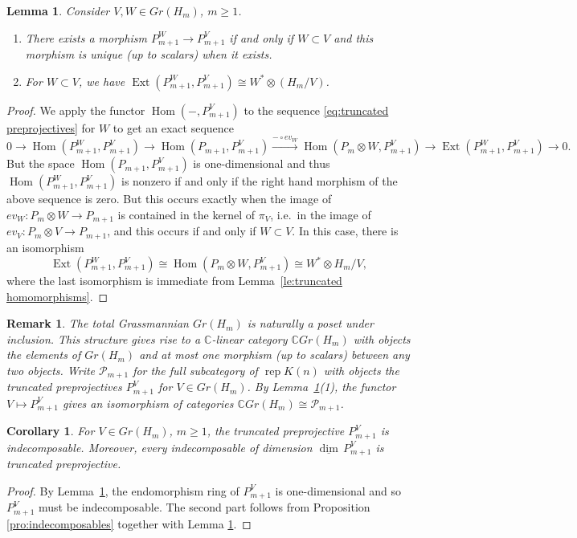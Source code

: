 \documentclass{amsart}
\newtheorem{corollary}[theorem]{Corollary}
\newtheorem{lemma}[theorem]{Lemma}
\newtheorem{remark}[theorem]{Remark}
\newcommand{\cP}{\mathcal{P}}
\newcommand\udim{{\underline{\dim}\, }}
\newcommand{\rep}{\operatorname{rep}}
\newcommand{\CC}{\mathbb{C}}
\newcommand{\Ext}{\operatorname{Ext}}
\newcommand{\Hom}{\operatorname{Hom}}
\begin{document}
\begin{lemma}
  \label{le:unique morphisms}
  Consider $V,W\in Gr(H_m)$, $m\ge1$.
  \begin{enumerate}
    \item There exists a morphism $P_{m+1}^W\to P_{m+1}^V$ if and only if $W\subset V$ and this morphism is unique (up to scalars) when it exists.
    \item For $W\subset V$, we have $\Ext(P_{m+1}^W,P_{m+1}^V)\cong W^*\otimes(H_m/V)$.
  \end{enumerate}
\end{lemma}
\begin{proof}
  We apply the functor $\Hom(-,P_{m+1}^V)$ to the sequence \eqref{eq:truncated preprojectives} for $W$ to get an exact sequence
  \[0\longrightarrow \Hom(P_{m+1}^W,P_{m+1}^V)\longrightarrow \Hom(P_{m+1},P_{m+1}^V)\stackrel{-\circ ev_W}{\longrightarrow} \Hom(P_m\otimes W,P_{m+1}^V)\longrightarrow \Ext(P_{m+1}^W,P_{m+1}^V)\longrightarrow 0.\]
  But the space $\Hom(P_{m+1},P_{m+1}^V)$ is one-dimensional and thus $\Hom(P_{m+1}^W,P_{m+1}^V)$ is nonzero if and only if the right hand morphism of the above sequence is zero.
  But this occurs exactly when the image of $ev_W:P_m\otimes W\to P_{m+1}$ is contained in the kernel of $\pi_V$, i.e.\ in the image of $ev_V:P_m\otimes V\to P_{m+1}$, and this occurs if and only if $W\subset V$. 
  In this case, there is an isomorphism 
  \[\Ext(P_{m+1}^W,P_{m+1}^V)\cong\Hom(P_m\otimes W,P_{m+1}^V)\cong W^*\otimes H_m/V,\]
  where the last isomorphism is immediate from Lemma~\ref{le:truncated homomorphisms}.
\end{proof}

\begin{remark}
  The total Grassmannian $Gr(H_m)$ is naturally a poset under inclusion.
  This structure gives rise to a $\CC$-linear category $\CC Gr(H_m)$ with objects the elements of $Gr(H_m)$ and at most one morphism (up to scalars) between any two objects.
  Write $\cP_{m+1}$ for the full subcategory of $\rep K(n)$ with objects the truncated preprojectives $P_{m+1}^V$ for $V\in Gr(H_m)$.
  By Lemma~\ref{le:unique morphisms}(1), the functor $V\mapsto P_{m+1}^V$ gives an isomorphism of categories $\CC Gr(H_m)\cong\cP_{m+1}$.
\end{remark}

\begin{corollary}
  \label{cor:indecomposable truncated} 
  For $V\in Gr(H_m)$, $m\ge1$, the truncated preprojective $P_{m+1}^V$ is indecomposable.
  Moreover, every indecomposable of dimension $\udim P_{m+1}^V$ is truncated preprojective.
\end{corollary}
\begin{proof}
  By Lemma~\ref{le:unique morphisms}, the endomorphism ring of $P_{m+1}^V$ is one-dimensional and so $P_{m+1}^V$ must be indecomposable.
  The second part follows from Proposition \ref{pro:indecomposables} together with Lemma \ref{le:unique morphisms}.
\end{proof}
\end{document}
